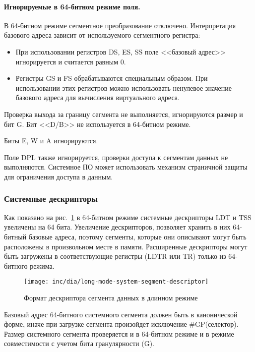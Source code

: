 \paragraph{Игнорируемые в 64-битном режиме поля.}
В 64-битном режиме сегментное преобразование отключено. Интерпретация базового адреса зависит от
используемого сегментного регистра:
\begin{itemize}
\item При использовании регистров DS, ES, SS поле <<базовый адрес>> игнорируется и считается равным 0.
\item Регистры GS и FS обрабатываются специальным образом. При использовании этих регистров можно
	использовать ненулевое значение базового адреса для вычисления виртуального адреса.
\end{itemize}

Проверка выхода за границу сегмента не выполняется, игнорируются размер и бит G. Бит <<D/B>> не
используется в 64-битном режиме.

Биты E, W и A игнорируются.

Поле DPL также игнорируется, проверки доступа к сегментам данных не выполняются.
Системное ПО может использовать механизм страничной защиты для ограничения доступа в данным.

\subsubsection*{Системные дескрипторы}
\label{subsec:system_desriptor_format}

Как показано на рис.~\ref{fig:long-mode-system-segment-descriptor-format} в 64-битном режиме
системные дескрипторы LDT и TSS увеличены на 64 бита. Увеличение дескрипторов, позволяет
хранить в них 64-битный базовые адреса, поэтому сегменты, которые они описывают могут быть
расположены в произвольном месте в памяти. Расширенные дескрипторы могут быть загружены в
соответствующие регистры (LDTR или TR) только из 64-битного режима.

\begin{figure}[ht]
  \centering
  \texttt{[image: inc/dia/long-mode-system-segment-descriptor]}
  \caption{Формат дескриптора сегмента данных в длинном режиме}
  \label{fig:long-mode-system-segment-descriptor-format}
\end{figure}

Базовый адрес 64-битного системного сегмента должен быть в канонической форме, иначе при
загрузке сегмента произойдет исключение \#GP(селектор). Размер системного сегмента проверяется и
в 64-битном режиме и в режиме совместимости с учетом бита гранулярности (G).

